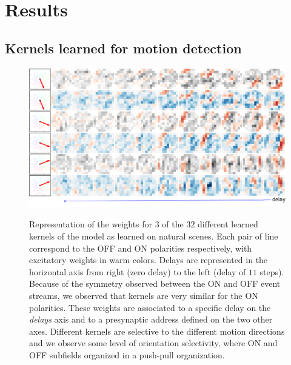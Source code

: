 \documentclass[default]{sn-jnl}%
\theoremstyle{thmstyleone}%
\theoremstyle{thmstyletwo}%
\theoremstyle{thmstylethree}%
\begin{document}
\section{Results}
\label{sec:results}
\subsection{Kernels learned for motion detection}
\begin{figure}[ht!]
    {\centering
    \includegraphics[width=\linewidth]{figures/motion_kernels.png}%
    }
    \caption{
    	Representation of the weights for $3$ of the $32$ different learned kernels of the model as learned on natural scenes. Each pair of line correspond to the OFF and ON polarities respectively, with excitatory weights in warm colors. Delays are represented in the horizontal axis from right (zero delay) to the left (delay of $11$ steps). Because of the symmetry observed between the ON and OFF event streams, we observed that kernels are very similar for the ON polarities. These weights are associated to a specific delay on the \textit{delays} axis and to a presynaptic address defined on the two other axes. %
	Different kernels are selective to the different motion directions and we observe some level of orientation selectivity, where ON and OFF subfields organized in a push-pull organization. 
	}
    \label{fig:kernels}
\end{figure} 
\end{document}
